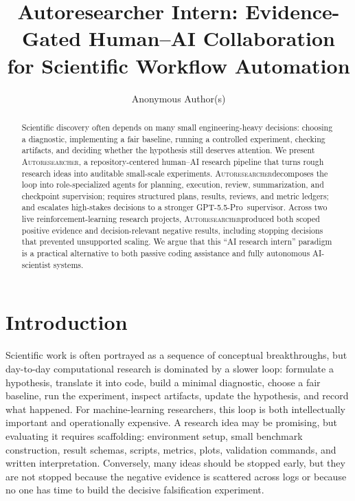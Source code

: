 \documentclass{article}
\title{Autoresearcher Intern: Evidence-Gated Human--AI Collaboration for Scientific Workflow Automation}
\author{Anonymous Author(s)}
\newcommand{\sys}{\textsc{Autoresearcher}}
\newcommand{\gptpro}{GPT-5.5-Pro}
\begin{document}
\ifcolmsubmission
\linenumbers
\fi

\maketitle

\begin{abstract}
Scientific discovery often depends on many small engineering-heavy decisions: choosing a diagnostic, implementing a fair baseline, running a controlled experiment, checking artifacts, and deciding whether the hypothesis still deserves attention. We present \sys, a repository-centered human--AI research pipeline that turns rough research ideas into auditable small-scale experiments. \sys decomposes the loop into role-specialized agents for planning, execution, review, summarization, and checkpoint supervision; requires structured plans, results, reviews, and metric ledgers; and escalates high-stakes decisions to a stronger \gptpro\ supervisor. Across two live reinforcement-learning research projects, \sys produced both scoped positive evidence and decision-relevant negative results, including stopping decisions that prevented unsupported scaling. We argue that this ``AI research intern'' paradigm is a practical alternative to both passive coding assistance and fully autonomous AI-scientist systems.
\end{abstract}

\section{Introduction}

Scientific work is often portrayed as a sequence of conceptual breakthroughs, but day-to-day computational research is dominated by a slower loop: formulate a hypothesis, translate it into code, build a minimal diagnostic, choose a fair baseline, run the experiment, inspect artifacts, update the hypothesis, and record what happened. For machine-learning researchers, this loop is both intellectually important and operationally expensive. A research idea may be promising, but evaluating it requires scaffolding: environment setup, small benchmark construction, result schemas, scripts, metrics, plots, validation commands, and written interpretation. Conversely, many ideas should be stopped early, but they are not stopped because the negative evidence is scattered across logs or because no one has time to build the decisive falsification experiment.
\end{document}
